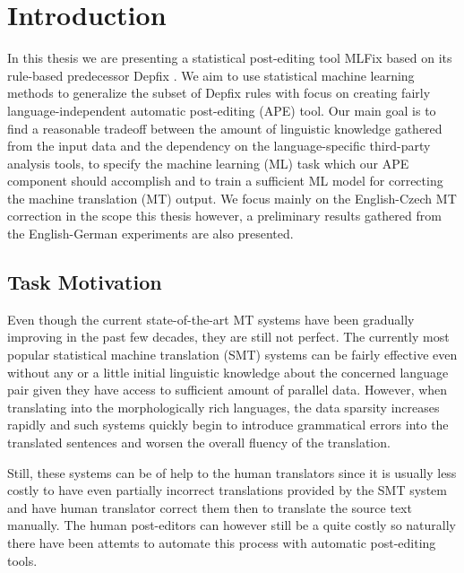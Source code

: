 \chapter{Introduction}

In this thesis we are presenting a statistical post-editing tool MLFix
based on its rule-based predecessor Depfix\cite{depfix:2014}
. We aim to use statistical machine learning methods to generalize the subset of Depfix rules
with focus on creating fairly language-independent automatic post-editing (APE) tool.
Our main goal is to find a reasonable tradeoff between the amount
of linguistic knowledge gathered from the input data and the dependency
on the language-specific third-party analysis tools, to specify the
machine learning (ML) task which our APE component should accomplish and to train
a sufficient ML model for correcting the machine translation (MT) output.
We focus mainly on the English-Czech MT correction in the scope this thesis however,
a preliminary results gathered from the English-German experiments are also presented.

\section{Task Motivation}

Even though the current state-of-the-art MT systems have been gradually improving in the
past few decades, they are still not perfect. The currently most popular statistical machine
translation (SMT) systems can be fairly effective even without any or a little initial
linguistic knowledge about the concerned language pair given they have access to sufficient
amount of parallel data. However, when translating into the morphologically rich languages,
the data sparsity increases rapidly and such systems quickly begin to introduce grammatical
errors into the translated sentences and worsen the overall fluency of the translation.

Still, these systems can be of help to the human translators since it is usually less costly
to have even partially incorrect translations provided by the SMT system and have
human translator correct them then to translate the source text manually.
The human post-editors can however still be a quite costly so naturally there have been
attemts to automate this process with automatic post-editing tools.

